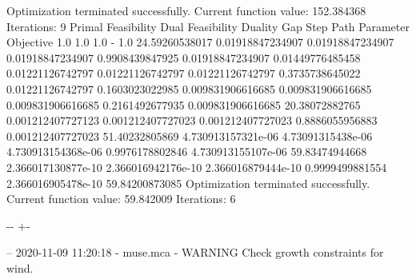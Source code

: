 \documentclass[letterpaper,10pt,english]{sphinxmanual}
\newlength\nbsphinxcodecellspacing
\begin{document}
{\begin{sphinxVerbatim}[commandchars=\\\{\}]
Optimization terminated successfully.
         Current function value: 152.384368
         Iterations: 9
Primal Feasibility  Dual Feasibility    Duality Gap         Step             Path Parameter      Objective
1.0                 1.0                 1.0                 -                1.0                 24.59260538017
0.01918847234907    0.01918847234907    0.01918847234907    0.9908439847925  0.01918847234907    0.01449776485458
0.01221126742797    0.01221126742797    0.01221126742797    0.3735738645022  0.01221126742797    0.1603023022985
0.009831906616685   0.009831906616685   0.009831906616685   0.2161492677935  0.009831906616685   20.38072882765
0.001212407727123   0.001212407727023   0.001212407727023   0.8886055956883  0.001212407727023   51.40232805869
4.730913157321e-06  4.73091315438e-06   4.730913154368e-06  0.9976178802846  4.730913155107e-06  59.83474944668
2.366017130877e-10  2.366016942176e-10  2.366016879444e-10  0.9999499881554  2.366016905478e-10  59.84200873085
Optimization terminated successfully.
         Current function value: 59.842009
         Iterations: 6
\end{sphinxVerbatim}
}

{

\kern-\sphinxverbatimsmallskipamount\kern-\baselineskip
\kern+\FrameHeightAdjust\kern-\fboxrule
\vspace{\nbsphinxcodecellspacing}

\begin{sphinxVerbatim}[commandchars=\\\{\}]
-- 2020-11-09 11:20:18 - muse.mca - WARNING
Check growth constraints for wind.

\end{sphinxVerbatim}
}
\end{document}
